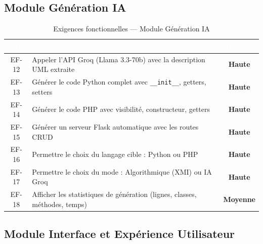 \documentclass[12pt,a4paper]{article}
\newcommand{\badge}[2]{%
  \colorbox{#1!15}{\textcolor{#1}{\small\textbf{#2}}}%
}
\newcommand{\highpriority}{\badge{dangered}{Haute}}
\newcommand{\mediumpriority}{\badge{warningorange}{Moyenne}}
\begin{document}
\subsection{Module Génération IA}

\begin{table}[H]
\centering
\renewcommand{\arraystretch}{1.3}
\begin{tabularx}{\textwidth}{|c|X|c|}
\hline
\rowcolor{darkblue!90}
\textcolor{white}{\textbf{ID}} &
\textcolor{white}{\textbf{Exigence}} &
\textcolor{white}{\textbf{Priorité}} \\
\hline
EF-12 & Appeler l'API Groq (Llama 3.3-70b) avec la description UML extraite & \highpriority \\
\hline
\rowcolor{lightgray}
EF-13 & Générer le code Python complet avec \texttt{\_\_init\_\_}, getters, setters & \highpriority \\
\hline
EF-14 & Générer le code PHP avec visibilité, constructeur, getters & \highpriority \\
\hline
\rowcolor{lightgray}
EF-15 & Générer un serveur Flask automatique avec les routes CRUD & \highpriority \\
\hline
EF-16 & Permettre le choix du langage cible : Python ou PHP & \highpriority \\
\hline
\rowcolor{lightgray}
EF-17 & Permettre le choix du mode : Algorithmique (XMI) ou IA Groq & \highpriority \\
\hline
EF-18 & Afficher les statistiques de génération (lignes, classes, méthodes, temps) & \mediumpriority \\
\hline
\end{tabularx}
\caption{Exigences fonctionnelles — Module Génération IA}
\end{table}

\subsection{Module Interface et Expérience Utilisateur}
\end{document}
